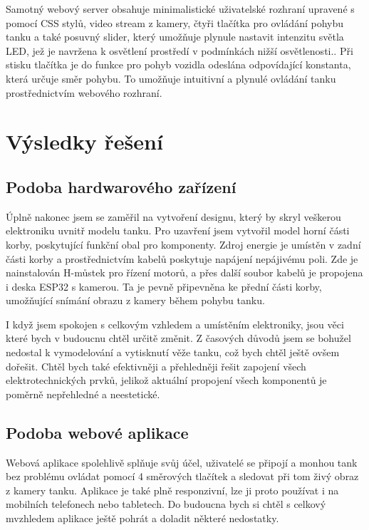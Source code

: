 \documentclass[12pt, a4paper,
oneside
openany
]{report}
\begin{document}
\noindent Samotný webový server obsahuje minimalistické uživatelské rozhraní upravené s pomocí CSS stylů, video stream z kamery, čtyři tlačítka pro ovládání pohybu tanku a také posuvný slider, který umožňuje plynule nastavit intenzitu světla LED, jež je navržena k osvětlení prostředí v podmínkách nižší osvětlenosti.. Při stisku tlačítka je do funkce pro pohyb vozidla odeslána odpovídající konstanta, která určuje směr pohybu. To umožňuje intuitivní a plynulé ovládání tanku prostřednictvím webového rozhraní.
 

	\chapter{Výsledky řešení}

    \section{Podoba hardwarového zařízení}
\noindent Úplně nakonec jsem se zaměřil na vytvoření designu, který by skryl veškerou elektroniku uvnitř modelu tanku. Pro uzavření jsem vytvořil model horní části korby, poskytující funkční obal pro komponenty. Zdroj energie je umístěn v zadní části korby a prostřednictvím kabelů poskytuje napájení nepájivému poli. Zde je nainstalován H-můstek pro řízení motorů, a přes další soubor kabelů je propojena i deska ESP32 s kamerou. Ta je pevně připevněna ke přední části korby, umožňující snímání obrazu z kamery během pohybu tanku.

\noindent I když jsem spokojen s celkovým vzhledem a umístěním elektroniky, jsou věci které bych v budoucnu chtěl určitě změnit. Z časových důvodů jsem se bohužel nedostal k vymodelování a vytisknutí věže tanku, což bych chtěl ještě ovšem dořešit. Chtěl bych také efektivněji a přehledněji řešit zapojení všech elektrotechnických prvků, jelikož aktuální propojení všech komponentů je poměrně nepřehledné a neestetické. 

    
    \section{Podoba webové aplikace}
    
    Webová aplikace spolehlivě splňuje svůj účel, uživatelé se připojí a monhou tank bez problému ovládat pomocí 4 směrových tlačítek a sledovat při tom živý obraz z kamery tanku. Aplikace je také plně responzivní, lze ji proto používat i na mobilních telefonech nebo tabletech. Do budoucna bych si chtěl s celkový mvzhledem aplikace ještě pohrát a doladit některé nedostatky.
	
\end{document}
